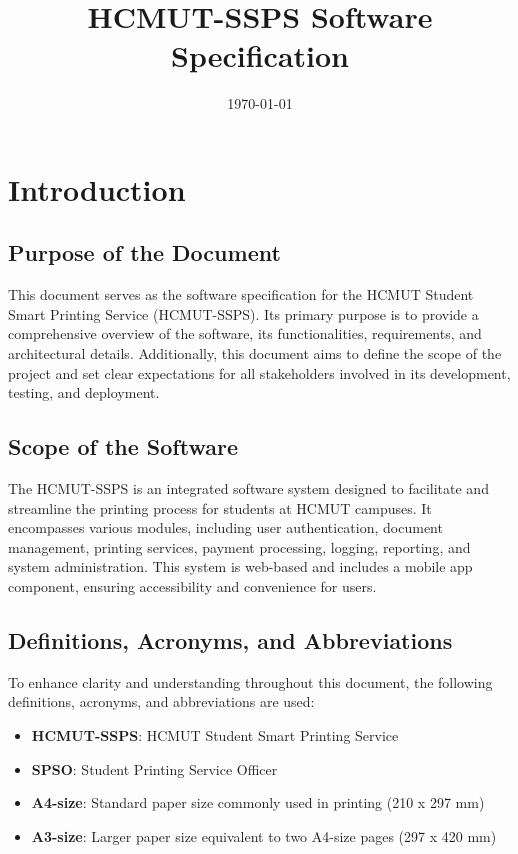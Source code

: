 \documentclass{article}
\begin{document}
\title{HCMUT-SSPS Software Specification}
\date{\today}
\maketitle

\newpage
\tableofcontents

\newpage

\section{Introduction}

\subsection{Purpose of the Document}
This document serves as the software specification for the HCMUT Student Smart Printing Service (HCMUT-SSPS). Its primary purpose is to provide a comprehensive overview of the software, its functionalities, requirements, and architectural details. Additionally, this document aims to define the scope of the project and set clear expectations for all stakeholders involved in its development, testing, and deployment.

\subsection{Scope of the Software}
The HCMUT-SSPS is an integrated software system designed to facilitate and streamline the printing process for students at HCMUT campuses. It encompasses various modules, including user authentication, document management, printing services, payment processing, logging, reporting, and system administration. This system is web-based and includes a mobile app component, ensuring accessibility and convenience for users.

\subsection{Definitions, Acronyms, and Abbreviations}
To enhance clarity and understanding throughout this document, the following definitions, acronyms, and abbreviations are used:

\begin{itemize}
    \item \textbf{HCMUT-SSPS}: HCMUT Student Smart Printing Service
    \item \textbf{SPSO}: Student Printing Service Officer
    \item \textbf{A4-size}: Standard paper size commonly used in printing (210 x 297 mm)
    \item \textbf{A3-size}: Larger paper size equivalent to two A4-size pages (297 x 420 mm)
\end{itemize}
\end{document}
